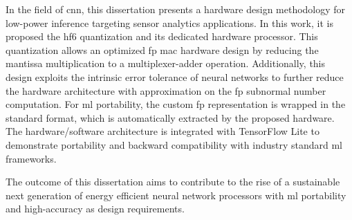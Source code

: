 In the field of \gls{cnn}, this dissertation presents a hardware design methodology for low-power inference targeting sensor analytics applications. In this work, it is proposed the \gls{hf6} quantization and its dedicated hardware processor. This quantization allows an optimized \gls{fp} \gls{mac} hardware design by reducing the mantissa multiplication to a multiplexer-adder operation. Additionally, this design exploits the intrinsic error tolerance of neural networks to further reduce the hardware architecture with approximation on the \gls{fp} subnormal number computation. For \gls{ml} portability, the custom \gls{fp} representation is wrapped in the standard format, which is automatically extracted by the proposed hardware. The hardware/software architecture is integrated with TensorFlow Lite to demonstrate portability and backward compatibility with industry standard \gls{ml} frameworks.

The outcome of this dissertation aims to contribute to the rise of a sustainable next generation of energy efficient neural network processors with \gls{ml} portability and high-accuracy as design requirements.